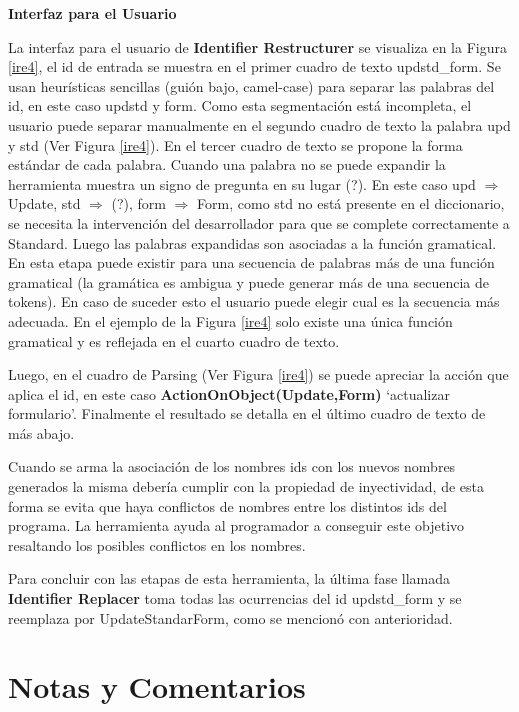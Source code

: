 \pagebreak
\noindent \textbf{Interfaz para el Usuario\\}

La interfaz para el usuario de \textbf{Identifier Restructurer} se visualiza en la Figura \ref{ire4}, el id de entrada se muestra en el primer cuadro de texto \textsf{updstd\_form}. Se usan heurísticas sencillas (guión bajo, camel-case) para separar las palabras del id, en este caso \textsf{updstd} y \textsf{form}. Como esta segmentación está incompleta, el usuario puede separar manualmente en el segundo cuadro de texto la palabra \textsf{upd} y \textsf{std} (Ver Figura \ref{ire4}). En el tercer cuadro de texto se propone la forma estándar de cada palabra. Cuando una palabra no se puede expandir la herramienta muestra un signo de pregunta en su lugar (?). En este caso \textsf{upd} $\Rightarrow$ \textsf{Update}, \textsf{std} $\Rightarrow$ (?), \textsf{form} $\Rightarrow$ \textsf{Form}, como \textsf{std} no está presente en el diccionario, se necesita la intervención del desarrollador para que se complete correctamente a \textsf{Standard}. Luego las palabras expandidas son asociadas a la función gramatical. En esta etapa puede existir para una secuencia de palabras más de una función gramatical (la gramática es ambigua y puede generar más de una secuencia de tokens). En caso de suceder esto el usuario puede elegir cual es la secuencia más adecuada. En el ejemplo de la Figura \ref{ire4} solo existe una única función gramatical y es reflejada en el cuarto cuadro de texto. 

Luego, en el cuadro de Parsing (Ver Figura \ref{ire4}) se puede apreciar la acción que aplica el id, en este caso \textbf{ActionOnObject(Update,Form)} `actualizar formulario'. Finalmente el resultado se detalla en el último cuadro de texto de más abajo.

Cuando se arma la asociación de los nombres ids con los nuevos nombres generados la misma debería cumplir con la propiedad de inyectividad, de esta forma se evita que haya conflictos de nombres entre los distintos ids del programa. La herramienta ayuda al programador a conseguir este objetivo resaltando los posibles conflictos en los nombres.

Para concluir con las etapas de esta herramienta, la última fase llamada \textbf{Identifier Replacer} toma todas las ocurrencias del id \textsf{updstd\_form} y se reemplaza por \textsf{UpdateStandarForm}, como se mencionó con anterioridad.

\section{Notas y Comentarios}

